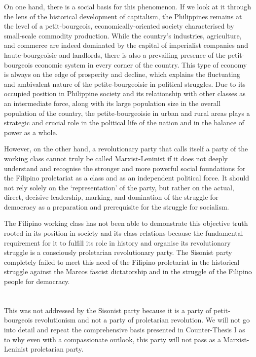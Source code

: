 On one hand, 
there is a social basis for this phenomenon. 
If we look at it through the lens of the historical development of capitalism, 
the Philippines remains at the level 
of a petit-bourgeois, economically-oriented society 
characterised by small-scale commodity production. 
While the country's industries, agriculture, and commerce 
are indeed dominated by 
the capital of imperialist companies 
and haute-bourgeoisie 
and landlords, 
there is also a prevailing presence of the petit-bourgeois economic system 
in every corner of the country. 
This type of economy is always on the edge of prosperity and decline, 
which explains the fluctuating and ambivalent nature 
of the petite-bourgeoisie in political struggles.
Due to its occupied position in Philippine society 
and its relationship with other classes as an intermediate force, 
along with its large population size in the overall population of the country, 
the petite-bourgeoisie in urban and rural areas 
plays a strategic and crucial role 
in the political life of the nation 
and in the balance of power as a whole.

However, on the other hand, 
a revolutionary party that calls itself 
a party of the working class 
cannot truly be called Marxist-Leninist 
if it does not deeply understand and recognise 
the stronger and more powerful social foundations 
for the Filipino proletariat 
as a class and as an independent political force. 
It should not rely solely on the `representation' of the party, 
but rather on the actual, direct, decisive leadership, marking, 
and domination of the struggle for democracy 
as a preparation and prerequisite 
for the struggle for socialism.

The Filipino working class has not been able to demonstrate 
this objective truth 
rooted in its position in society 
and its class relations 
because the fundamental requirement for it to fulfill its role in history 
and organise its revolutionary struggle 
is a consciously proletarian revolutionary party. 
The Sisonist party completely failed 
to meet this need of the Filipino proletariat 
in the historical struggle against the Marcos fascist dictatorship 
and in the struggle of the Filipino people for democracy.


\section{}
This was not addressed 
by the Sisonist party 
because it is a party of petit-bourgeois revolutionism 
and not a party of proletarian revolution. 
We will not go into detail 
and repeat the comprehensive basis 
presented in Counter-Thesis I
as to why even with a compassionate outlook, 
this party will not pass as a Marxist-Leninist proletarian party.

